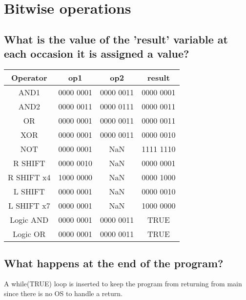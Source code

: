 \section[short]{Bitwise operations}

\subsection[short]{What is the value of the 'result' variable at each occasion it is assigned a value?}

\begin{center}
    \begin{tabular}{ |c|c|c|c| } 
        \hline
        Operator &  op1 & op2 & result\\
        \hline
        AND1 & 0000 0001 & 0000 0011 & 0000 0001\\
        AND2 & 0000 0011 & 0000 0111 & 0000 0011\\
        OR & 0000 0001 & 0000 0011 & 0000 0011\\
        XOR & 0000 0001 & 0000 0011 & 0000 0010\\
        NOT & 0000 0001 & NaN & 1111 1110\\
        R SHIFT & 0000 0010 & NaN & 0000 0001\\
        R SHIFT x4 & 1000 0000 & NaN & 0000 1000\\
        L SHIFT & 0000 0001 & NaN & 0000 0010\\
        L SHIFT x7 & 0000 0001 & NaN & 1000 0000\\
        Logic AND & 0000 0001 & 0000 0011 & TRUE\\
        Logic OR & 0000 0001 & 0000 0011 & TRUE\\
        \hline
    \end{tabular}
\end{center}
\subsection[short]{What happens at the end of the program?}
A while(TRUE) loop is inserted to keep the program from returning from main since there is no OS to handle a return. 